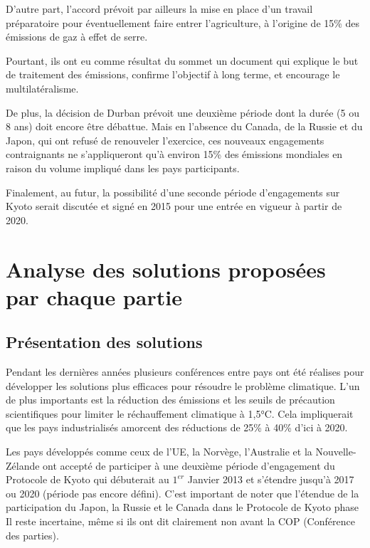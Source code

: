 \documentclass[a4paper,10pt]{article}
\begin{document}
D’autre  part, l'accord  prévoit  par ailleurs  la  mise en  place d'un  travail
préparatoire pour éventuellement faire entrer l'agriculture, à l'origine de 15\%
des émissions de gaz à effet de serre. 



Pourtant, ils ont eu comme résultat du sommet un document qui explique le but de traitement des émissions, confirme l'objectif à long terme, et encourage le multilatéralisme.


De plus, la décision de Durban prévoit  une deuxième période dont la durée (5 ou
8 ans) doit encore  être débattue. Mais en l'absence du Canada,  de la Russie et
du  Japon, qui  ont refusé  de renouveler  l'exercice, ces  nouveaux engagements
contraignants  ne s'appliqueront qu'à  environ 15\%  des émissions  mondiales en
raison du volume impliqué dans les pays participants.


Finalement, au  futur, la possibilité  d'une seconde période  d'engagements sur
Kyoto serait  discutée et signé en  2015 pour une  entrée en vigueur à  partir de
2020. 


\section{Analyse des solutions proposé{\color{red}e}s par chaque partie}

\subsection{Présentation des solutions}

Pendant les dernières  années plusieurs conférences entre pays  ont été réalises
pour  développer  les  solutions   plus  efficaces  pour  résoudre  le  problème
climatique. L’un de plus importants est la réduction des émissions et les seuils
de  précaution   scientifiques  pour  limiter  le   réchauffement  climatique  à
1,5°C. Cela impliquerait que les  pays industrialisés amorcent des réductions de
25\% à 40\% d'ici à 2020. 


Les  pays  développés  comme  ceux  de  l’UE,  la  Norvège,  l'Australie  et  la
Nouvelle-Zélande ont  accepté de participer à une  deuxième période d'engagement
du Protocole  de Kyoto qui débuterait  au $1^{er}$ Janvier 2013  et s'étendre jusqu'à
2017 ou 2020 (période pas encore défini). C’est important de noter que l'étendue
de la participation du Japon, la Russie  et le Canada dans le Protocole de Kyoto
phase  Il reste incertaine,  même si  ils ont  dit clairement  non avant  la COP
(Conférence des parties).
\end{document}
